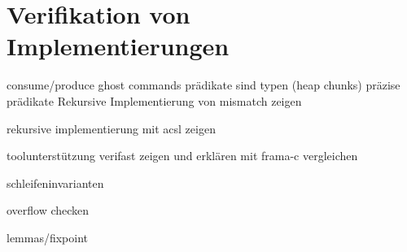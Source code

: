 ﻿\section{Verifikation von Implementierungen}

consume/produce
ghost commands
prädikate sind typen (heap chunks)
präzise prädikate
Rekursive Implementierung von mismatch zeigen

rekursive implementierung mit acsl zeigen

toolunterstützung verifast zeigen und erklären
mit frama-c vergleichen


schleifeninvarianten

overflow checken

lemmas/fixpoint

